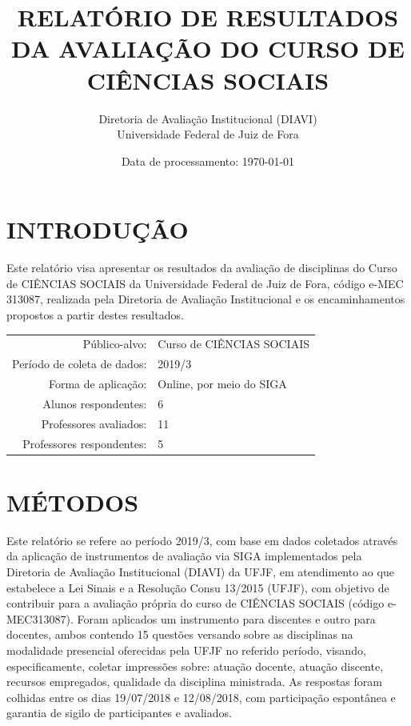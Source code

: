 \documentclass[a4paper,10pt]{article}
\date{Data de processamento: \today}
\begin{document}
\author{Diretoria de Avaliação Institucional (DIAVI) \\ Universidade Federal de Juiz de Fora}

\title{RELATÓRIO DE RESULTADOS DA AVALIAÇÃO DO CURSO DE CIÊNCIAS SOCIAIS}
\maketitle
\section{INTRODUÇÃO}
Este relatório visa apresentar os resultados da avaliação de disciplinas do Curso     de CIÊNCIAS SOCIAIS da Universidade Federal de Juiz de Fora, código e-MEC 313087, realizada pela     Diretoria de Avaliação Institucional e os encaminhamentos propostos a     partir destes resultados.

\begin{center}
\begin{tabularx}{\linewidth}{r|X}

Público-alvo:& Curso de CIÊNCIAS SOCIAIS\\

Período de coleta de dados:& 2019/3 \\

Forma de aplicação:& Online, por meio do SIGA\\

Alunos respondentes:& 6\\

Professores avaliados:& 11\\

Professores respondentes:& 5\\
\end{tabularx}
\end{center}

\section{MÉTODOS}
Este relatório se refere ao período 2019/3, com base em dados     coletados através da aplicação de instrumentos de avaliação via SIGA     implementados pela Diretoria de Avaliação Institucional (DIAVI) da UFJF, em atendimento     ao que estabelece a Lei Sinais e a Resolução Consu 13/2015 (UFJF),     com objetivo de contribuir para a avaliação própria do curso de CIÊNCIAS SOCIAIS (código e-MEC313087). Foram aplicados um instrumento para discentes e outro para docentes, ambos contendo     15 questões versando sobre as disciplinas na modalidade presencial oferecidas pela UFJF no     referido período, visando, especificamente, coletar impressões sobre: atuação docente, atuação discente,     recursos empregados, qualidade da disciplina ministrada.     As respostas foram colhidas entre os dias 19/07/2018 e 12/08/2018, com participação espontânea e garantia de    sigilo de participantes e avaliados.
\end{document}

